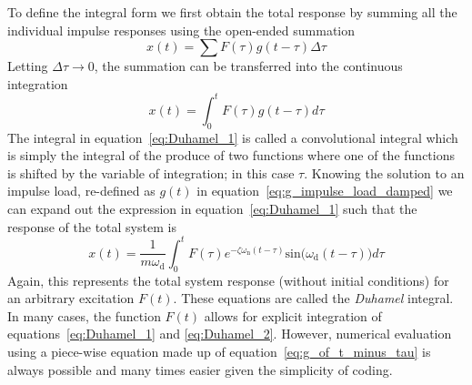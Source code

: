 \documentclass[12pt,letter]{article}
\begin{document}
To define the integral form we first obtain the total response by summing all the individual impulse responses using the open-ended summation
\begin{equation}
	x(t) = \sum F( \tau ) g(t- \tau ) \Delta \tau
\end{equation}
Letting $\Delta \tau \rightarrow 0$, the summation can be transferred into the continuous integration  
\begin{equation}
	x(t) = \int_{0}^{t} F( \tau ) g(t- \tau ) d \tau
	\label{eq:Duhamel_1}	
\end{equation}
The integral in equation~\ref{eq:Duhamel_1} is called a convolutional integral which is simply the integral of the produce of two functions where one of the functions is shifted by the variable of integration; in this case $\tau$. Knowing the solution to an impulse load, re-defined as $g(t)$ in equation~\ref{eq:g_impulse_load_damped} we can expand out the expression in equation~\ref{eq:Duhamel_1} such that the response of the total system is
\begin{equation}
	x(t) = \frac{1}{m \omega_\text{d}} \int_{0}^{t} F(\tau) e^{-\zeta \omega_\text{n} (t-\tau)} \text{sin}\big(\omega_\text{d}(t-\tau)\big) d \tau
	\label{eq:Duhamel_2}	
\end{equation}
Again, this represents the total system response (without initial conditions) for an arbitrary excitation $F(t)$.  These equations are called the \textit{Duhamel} integral. In many cases, the function $F(t)$ allows for explicit integration of equations~\ref{eq:Duhamel_1} and \ref{eq:Duhamel_2}. However, numerical evaluation using a piece-wise equation made up of equation~\ref{eq:g_of_t_minus_tau} is always possible and many times easier given the simplicity of coding. 
\end{document}
